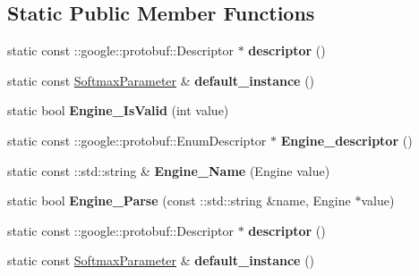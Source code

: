\subsection*{Static Public Member Functions}
\begin{DoxyCompactItemize}
\item 
\mbox{\label{classcaffe_1_1_softmax_parameter_abec967f9fe61e39ad068c274af9e193d}} 
static const \+::google\+::protobuf\+::\+Descriptor $\ast$ {\bfseries descriptor} ()
\item 
\mbox{\label{classcaffe_1_1_softmax_parameter_a6750ca70c73c0dca45bb9d501c6ced54}} 
static const \mbox{\hyperlink{classcaffe_1_1_softmax_parameter}{Softmax\+Parameter}} \& {\bfseries default\+\_\+instance} ()
\item 
\mbox{\label{classcaffe_1_1_softmax_parameter_a8ed8259c601ea557b755fa1d39e3f81c}} 
static bool {\bfseries Engine\+\_\+\+Is\+Valid} (int value)
\item 
\mbox{\label{classcaffe_1_1_softmax_parameter_ae8e12f9dbbb45540f85d8a0afa30d9be}} 
static const \+::google\+::protobuf\+::\+Enum\+Descriptor $\ast$ {\bfseries Engine\+\_\+descriptor} ()
\item 
\mbox{\label{classcaffe_1_1_softmax_parameter_a0e611a92ff16e37fb26d07881a9ce4ed}} 
static const \+::std\+::string \& {\bfseries Engine\+\_\+\+Name} (Engine value)
\item 
\mbox{\label{classcaffe_1_1_softmax_parameter_a9e8ec9f61d7af09a0bf772cdf537626d}} 
static bool {\bfseries Engine\+\_\+\+Parse} (const \+::std\+::string \&name, Engine $\ast$value)
\item 
\mbox{\label{classcaffe_1_1_softmax_parameter_abf097d1a7fc48ddf42e48a17904d6ecc}} 
static const \+::google\+::protobuf\+::\+Descriptor $\ast$ {\bfseries descriptor} ()
\item 
\mbox{\label{classcaffe_1_1_softmax_parameter_a509a56595528040a4926ad7e0e3361dc}} 
static const \mbox{\hyperlink{classcaffe_1_1_softmax_parameter}{Softmax\+Parameter}} \& {\bfseries default\+\_\+instance} ()

\end{DoxyCompactItemize}
